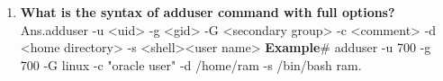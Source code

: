 \begin{enumerate}
    \bigskip
    \bigskip

    \item\textbf {What is the syntax of adduser  command with full options?}
     Ans.adduser  -u <uid>  -g <gid>  -G <secondary group> -c  <comment>  -d <home
    directory> -s <shell><user name>
    \newline
    \textbf{Example}\# adduser  -u  700  -g  700  -G  linux   -c  "oracle user"   -d  /home/ram   -s
    /bin/bash ram.
    
\end{enumerate}
